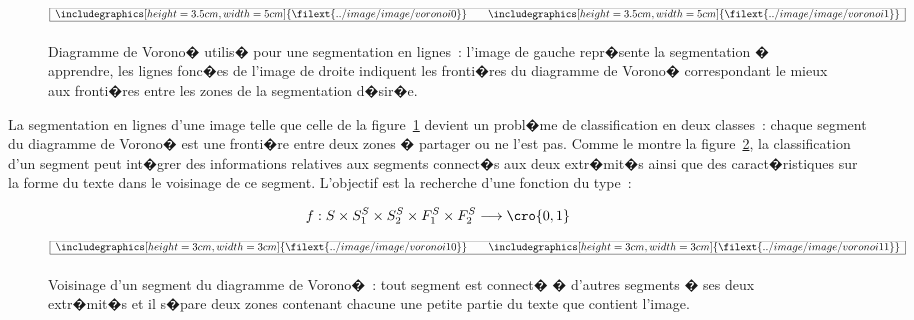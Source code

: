             \begin{figure}[ht]
        $$\frame{$\begin{array}[c]{ccc}
        \includegraphics[height=3.5cm, width=5cm] {\filext{../image/image/voronoi0}} & & 
        \includegraphics[height=3.5cm, width=5cm] {\filext{../image/image/voronoi1}}
        \end{array}$}$$
        \caption{    Diagramme de Vorono� utilis� pour une segmentation en lignes~: l'image de gauche repr�sente la 
                            segmentation � apprendre, les lignes fonc�es de l'image de droite indiquent les fronti�res du 
                            diagramme de Vorono� correspondant le mieux aux fronti�res entre les zones 
                            de la segmentation d�sir�e.}
        \label{image_voronoi1}
            \end{figure}

La segmentation en lignes d'une image telle que celle de la figure~\ref{image_voronoi1} devient un probl�me de classification en deux classes~: chaque segment du diagramme de Vorono� est une fronti�re entre deux zones � partager ou ne l'est pas. Comme le montre la figure~\ref{image_voronoi_local}, la classification d'un segment peut int�grer des informations relatives aux segments connect�s aux deux extr�mit�s ainsi que des caract�ristiques sur la forme du texte dans le voisinage de ce segment. L'objectif est la recherche d'une fonction du type~:

            \begin{eqnarray}
            f : S \times S^S_1 \times S^S_2 \times F^S_1 \times F^S_2 \longrightarrow \cro{0,1}
            \label{image_voronoi_f}
            \end{eqnarray}
        
            \begin{figure}[ht]
        $$\frame{$\begin{array}[c]{ccc}
        \includegraphics[height=3cm, width=3cm] {\filext{../image/image/voronoi10}} &&
        \includegraphics[height=3cm, width=3cm] {\filext{../image/image/voronoi11}}
        \end{array}$}$$
        \caption{    Voisinage d'un segment du diagramme de Vorono�~: tout segment 
                            est connect� � d'autres segments � ses 
                            deux extr�mit�s et il s�pare deux zones contenant chacune une petite partie 
                            du texte que contient l'image.}
        \label{image_voronoi_local}
            \end{figure}
            
